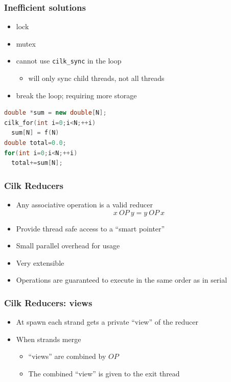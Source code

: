 \documentclass[fleqn,xcolor=table,10pt,final]{beamer}
\begin{document}
\begin{frame}[fragile]
  \frametitle{Inefficient solutions}
  \begin{itemize}
    \item lock
    \item mutex
  \end{itemize}
  \begin{itemize}
    \item cannot use {\tt cilk\_sync} in the loop
      \begin{itemize}
        \item will only sync child threads, not all threads
      \end{itemize}
  \end{itemize}
  \begin{itemize}
    \item break the loop; requiring more storage
  \end{itemize}
  \begin{lstlisting}[language=C++,basicstyle=\scriptsize]
double *sum = new double[N];
cilk_for(int i=0;i<N;++i)
  sum[N] = f(N)
double total=0.0;
for(int i=0;i<N;++i)
  total+=sum[N];
  \end{lstlisting}
\end{frame}

\begin{frame}
  \frametitle{Cilk Reducers}
  \begin{itemize}
    \item Any associative operation is a valid reducer
      \begin{equation*}
        x\ OP\ y = y\ OP\ x
      \end{equation*}
    \item Provide thread safe access to a ``smart pointer''
    \item Small parallel overhead for usage
    \item Very extensible
    \item Operations are guaranteed to execute in the same order as in serial
  \end{itemize}
\end{frame}

\begin{frame}
  \frametitle{Cilk Reducers: views}
  \begin{itemize}
    \item At spawn each strand gets a private ``view'' of the reducer
    \item When strands merge
      \begin{itemize}
        \item ``views'' are combined by $OP$
        \item The combined ``view'' is given to the exit thread
      \end{itemize}
  \end{itemize}
\end{frame}
\end{document}
